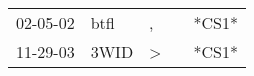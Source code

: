 \begin{supertabular}{lllll}
 02-05-02 &  btfl &             , &   &  *CS1* \\
 11-29-03 &  3WID &  \textgreater &   &  *CS1* \\
\end{supertabular}
